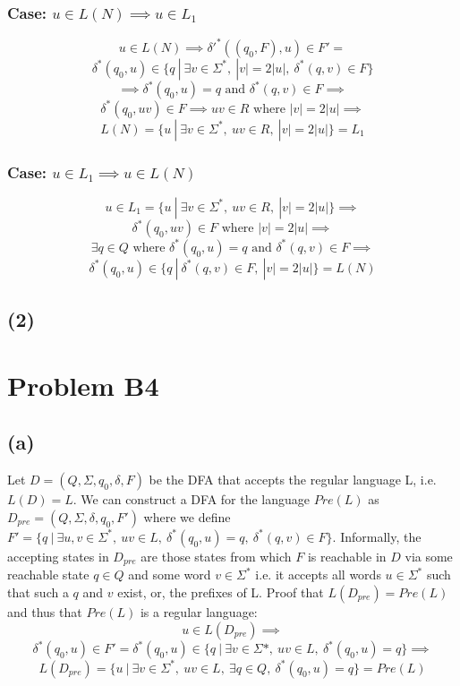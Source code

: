 \documentclass[12pt]{article}
\begin{document}
  \subsubsection*{Case: $u \in L(N) \implies u \in L_1$}
  $$ u \in L(N) \implies \delta{'}^*((q_0, F), u) \in F' = $$
  $$ \delta^*(q_0, u) \in \{q \:|\: \exists v \in \Sigma^* ,\:
  |v| = 2|u| ,\: \delta^*(q,v) \in F\}$$
  $$\implies \delta^*(q_0, u) = q \text{ and } \delta^*(q,v) \in F \implies$$
  $$\delta^*(q_0, uv) \in F \implies uv \in R \text{ where }|v|= 2|u| \implies$$
  $$L(N)=\{u \:|\: \exists v \in \Sigma^* ,\: uv \in R ,\: |v| = 2|u|\}=L_1$$
  \subsubsection*{Case: $u \in L_1 \implies u \in L(N)$}
  $$u \in L_1 = \{u \:|\: \exists v \in \Sigma^* ,\: uv \in R ,\: |v| = 2|u|\}
  \implies$$ $$\delta^*(q_0, uv) \in F  \text{ where } |v| = 2|u| \implies$$
  $$\exists q \in Q \text{ where } \delta^*(q_0, u) = q \text { and }
  \delta^*(q, v) \in F \implies$$
  $$\delta^*(q_0, u) \in \{q \:|\: \delta^*(q,v) \in F ,\: |v| = 2|u|\}= L(N)$$

\subsection*{(2)}

\section*{Problem B4}
\subsection*{(a)}
  Let $D = (Q, \Sigma, q_0, \delta, F)$ be the DFA that accepts the regular
  language L, i.e. $L(D) = L$. We can construct a DFA for the language
  $Pre(L)$ as $D_{pre} = (Q, \Sigma, \delta, q_0, F')$ where we define
  $F' = \{q \:|\: \exists u,v \in \Sigma^* ,\: uv \in L
  ,\: \delta^* (q_0, u) = q ,\: \delta^* (q, v) \in F\}$.
  Informally, the accepting states in $D_{pre}$ are those states from which
  $F$ is reachable in $D$ via some reachable state $q \in Q$ and some
  word $v \in \Sigma^*$ i.e. it accepts all words $u \in \Sigma^*$
  such that such a $q$ and $v$ exist, or, the prefixes of L.
  Proof that $L(D_{pre}) = Pre(L)$ and thus that $Pre(L)$ is a regular language:
  $$u \in L(D_{pre}) \implies$$ $$\delta^*(q_0, u) \in F' =
  \delta^*(q_0, u) \in \{q \:|\: \exists v \in \Sigma* ,\: uv \in L
  ,\: \delta^*(q_0, u) = q\} \implies$$
  $$L(D_{pre}) = \{u \:|\: \exists v \in \Sigma^* ,\: uv \in L ,\:
  \exists q \in Q ,\: \delta^*(q_0, u) = q \}
  = Pre(L)$$
 
\end{document}
